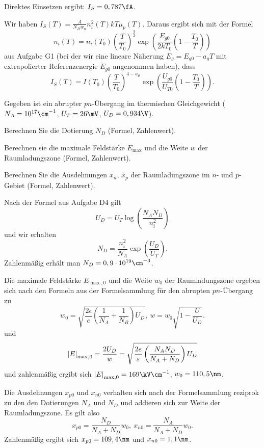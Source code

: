 \documentclass{article}
\begin{document}
\begin{solution}
    \begin{tasks}
            \item Direktes Einsetzen ergibt: $I_S=0,787\fA$.
            \item Wir haben $I_S(T)=\frac{A}{N_D w_n} n_i^2(T) kT\mu_p(T)$. Daraus ergibt sich mit der Formel
        $$
        n_i(T)=n_i(T_0){\left(\frac T {T_0}\right)}^{\frac 3 2}\exp\left(\frac{E_{g0}}{2kT_0}\left(1-\frac{T_0}{T}\right)\right)
        $$
        aus Aufgabe G1 (bei der wir eine lineare Näherung $E_g=E_{g0}-a_g T$ mit extrapolierter Referenzenergie $E_{g0}$ angenommen haben), dass
        $$
        I_S(T)=I(T_0){\left(\frac{T}{T_0}\right)}^{4-a_\mu}\exp\left(\frac{U_{g0}}{U_{T0}}\left(1-\frac{T_0}{T}\right)\right).
        $$
    \end{tasks}
\end{solution}

\begin{exercise}
Gegeben ist ein abrupter $pn$-Übergang im thermischen Gleichgewicht ($N_A=10^{17}\cm^{-1}$, $U_T=26\mV$, $U_D=0,934\V$).
\begin{tasks}
        \item Berechnen Sie die Dotierung $N_D$ (Formel, Zahlenwert).
        \item Berechnen sie die maximale Feldstärke $E_{\max}$ und die Weite $w$ der Raumladungszone (Formel, Zahlenwert).
    \item Berechnen Sie die Ausdehnungen $x_n$, $x_p$ der Raumladungszone im $n$- und $p$-Gebiet (Formel, Zahlenwert). 
\end{tasks}
\end{exercise}

\begin{solution}
    \begin{tasks}
            \item Nach der Formel aus Aufgabe D4 gilt
        $$
        U_D=U_T\log\left(\frac{N_A N_D}{n_i^2}\right)
        $$
        und wir erhalten
        $$
        N_D=\frac{n_i^2}{N_A}\exp\left(\frac{U_D}{U_T}\right).
        $$
        Zahlenmäßig erhält man $N_D=\float{0,9}{19}\cm^{-3}$.
            \item Die maximale Feldstärke $E_{\max,0}$ und die Weite $w_0$ der Raumladungszone ergeben sich nach den Formeln aus der Formelsammlung für den abrupten $pn$-Übergang zu
        $$
        w_0=\sqrt{\frac{2\epsilon}{e}\left(\frac 1 {N_A} + \frac 1 {N_B}\right)U_D},\ w=w_0\sqrt{1-\frac U {U_D}}.
        $$
        und
        $$
        \left|E\right|_{\max,0}=\frac{2U_D}{w}=\sqrt{\frac {2e}{\varepsilon}\left(\frac {N_A N_D}{N_A+N_D}\right)U_D}
        $$
        und zahlenmäßig ergibt sich $\abs{E}_{\max,0}=169\kV\cm^{-1}$, $w_0=110,5\nm$.
            \item Die Ausdehnungen $x_{p0}$ und $x_{n0}$ verhalten sich nach der Formelsammlung reziprok zu den den Dotierungen $N_A$ und $N_D$ und addieren sich zur Weite der Raumladungszone. Es gilt also
        $$
        x_{p0} =\frac{N_D}{N_A+N_D}w_0,\ x_{n0}=\frac{N_A}{N_A+N_D}w_0.
        $$
        Zahlenmäßig ergibt sich $x_{p0}=109,4\nm$ und $x_{n0}=1,1\nm$.
    \end{tasks}
\end{solution}
\end{document}
